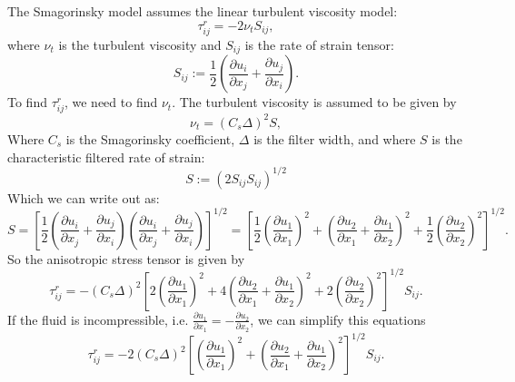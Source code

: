 \documentclass[11pt,a4paper]{article}
\begin{document}
The Smagorinsky model assumes the linear turbulent viscosity model:
$$\tau_{ij}^r = -2\nu_t {S}_{ij},$$
where $\nu_t$ is the turbulent viscosity and $S_{ij}$ is the rate of strain tensor:
$${S}_{ij} := \frac{1}{2}\left( \frac{\partial {u}_i}{\partial x_j} + \frac{\partial {u}_j}{\partial x_i}\right).$$
To find $\tau_{ij}^r$, we need to find $\nu_t$. The turbulent viscosity is assumed to be given by
$$\nu_t = (C_s \Delta)^2 {S},$$
Where $C_s$ is the Smagorinsky coefficient, $\Delta$ is the filter width, and where ${S}$ is the characteristic filtered rate of strain:
$${S} := \left(2{S}_{ij}{S}_{ij}\right)^{1/2}$$
Which we can write out as:
$${S} = \left[\frac{1}{2}\left( \frac{\partial {u}_i}{\partial x_j} + \frac{\partial {u}_j}{\partial x_i}\right)\left( \frac{\partial {u}_i}{\partial x_j} + \frac{\partial {u}_j}{\partial x_i}\right)\right]^{1/2} = \left[\frac{1}{2}\left( \frac{\partial {u}_1}{\partial x_1}\right)^2+\left( \frac{\partial {u}_2}{\partial x_1} + \frac{\partial {u}_1}{\partial x_2}\right)^2+\frac{1}{2}\left( \frac{\partial {u}_2}{\partial x_2}\right)^2 \right]^{1/2}.$$
So the anisotropic stress tensor is given by
\begin{equation}
\tau_{ij}^r = -(C_s \Delta)^2\left[2\left( \frac{\partial {u}_1}{\partial x_1}\right)^2+4\left( \frac{\partial {u}_2}{\partial x_1} + \frac{\partial {u}_1}{\partial x_2}\right)^2+2\left( \frac{\partial {u}_2}{\partial x_2}\right)^2 \right]^{1/2}{S}_{ij}.
\end{equation}
If the fluid is incompressible, i.e. $\frac{\partial {u}_1}{\partial x_1} = -\frac{\partial {u}_2}{\partial x_2}$, we can simplify this equations
\begin{equation}\label{smagTau}
\tau_{ij}^r = -2(C_s \Delta)^2\left[\left( \frac{\partial {u}_1}{\partial x_1}\right)^2+\left( \frac{\partial {u}_2}{\partial x_1} + \frac{\partial {u}_1}{\partial x_2}\right)^2 \right]^{1/2}{S}_{ij}.
\end{equation}
\end{document}
